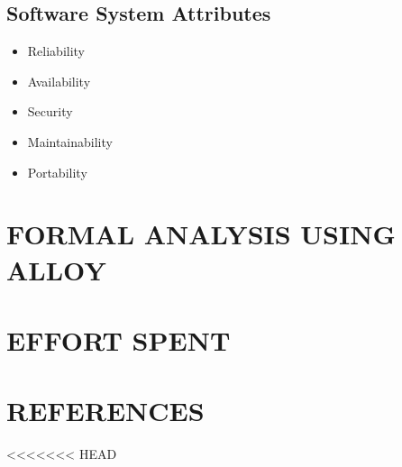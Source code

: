 \documentclass{article}
\begin{document}
\subsection{Software System Attributes}	
		\begin{itemize}
			\item Reliability
			\item Availability
			\item Security
			\item Maintainability
			\item Portability
		\end{itemize}

\section{FORMAL ANALYSIS USING ALLOY}

\section{EFFORT SPENT}

\section{REFERENCES}
<<<<<<< HEAD
\end{document}
